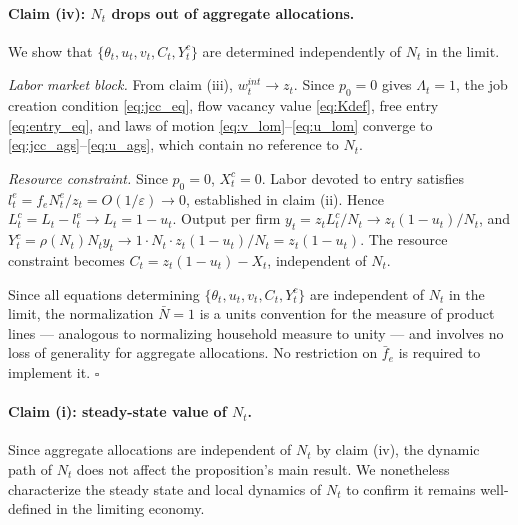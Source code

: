 \documentclass[authoryear, review, 12pt]{elsarticle}
\begin{document}
\paragraph{Claim (iv): $N_t$ drops out of aggregate 
	allocations.}

We show that $\{\theta_t, u_t, v_t, C_t, Y_t^c\}$ 
are determined independently of $N_t$ in the limit.

\emph{Labor market block.} From claim (iii), 
$w_t^{int}\to z_t$. Since $p_0=0$ gives $\Lambda_t=1$, 
the job creation condition \eqref{eq:jcc_eq}, flow 
vacancy value \eqref{eq:Kdef}, free entry 
\eqref{eq:entry_eq}, and laws of motion 
\eqref{eq:v_lom}--\eqref{eq:u_lom} converge to 
\eqref{eq:jcc_ags}--\eqref{eq:u_ags}, which contain 
no reference to $N_t$.

\emph{Resource constraint.} Since $p_0=0$, 
$X_t^c=0$. Labor devoted to entry satisfies 
$l_t^e = f_e N_t^e/z_t = O(1/\varepsilon)\to 0$, 
established in claim (ii). Hence 
$L_t^c = L_t - l_t^e \to L_t = 1-u_t$. 
Output per firm $y_t = z_t L_t^c/N_t \to 
z_t(1-u_t)/N_t$, and $Y_t^c = \rho(N_t)N_t y_t 
\to 1\cdot N_t\cdot z_t(1-u_t)/N_t = z_t(1-u_t)$. 
The resource constraint becomes 
$C_t = z_t(1-u_t)-X_t$, independent of $N_t$.

Since all equations determining 
$\{\theta_t,u_t,v_t,C_t,Y_t^c\}$ are independent 
of $N_t$ in the limit, the normalization $\bar{N}=1$ 
is a units convention for the measure of product 
lines --- analogous to normalizing household measure 
to unity --- and involves no loss of generality for 
aggregate allocations. No restriction on $\bar{f}_e$ 
is required to implement it. $\square$

\paragraph{Claim (i): steady-state value of $N_t$.}

Since aggregate allocations are independent of 
$N_t$ by claim (iv), the dynamic path of $N_t$ 
does not affect the proposition's main result. We 
nonetheless characterize the steady state and 
local dynamics of $N_t$ to confirm it remains 
well-defined in the limiting economy.
\end{document}
